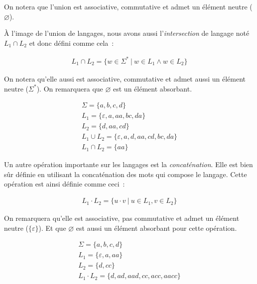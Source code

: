 \noindent On notera que l'union est associative, commutative et admet un
élément neutre (\(\varnothing\)).

\vphantom{}

À l'image de l'union de langages, nous avons aussi l'\textit{intersection} de
langage noté \(L_1 \cap L_2\) et donc défini comme cela~:

\begin{gather}
    L_1 \cap L_2 = \{w \in \Sigma ^ * ~|~ w \in L_1 \land w \in L_2\}
\end{gather}

\noindent On notera qu'elle aussi est associative, commutative et admet
aussi un élément neutre (\(\Sigma ^ *\)). On remarquera que \(\varnothing\) est
un élément absorbant.

\begin{example}
    \begin{gather}
        \Sigma = \{a, b, c, d\} \\
        L_1 = \{\varepsilon, a, aa, bc, da\} \\
        L_2 = \{d, aa, cd\} \\
        L_1 \cup L_2 = \{\varepsilon, a, d, aa, cd, bc, da\} \\
        L_1 \cap L_2 = \{aa\}
    \end{gather}
\end{example}

Un autre opération importante sur les langages est la \textit{concaténation}.
Elle est bien sûr définie en utilisant la concaténation des mots qui compose le
langage. Cette opération est ainsi définie comme ceci~:

\begin{gather}
    L_1 \cdot L_2 = \{u \cdot v ~|~ u \in L_1, v \in L_2\}
\end{gather}

\noindent On remarquera qu'elle est associative, pas commutative et admet un
élément neutre (\(\{\varepsilon\}\)). Et que \(\varnothing\) est aussi un
élément absorbant pour cette opération.

\begin{example}
    \begin{gather}
        \Sigma = \{a, b, c, d\} \\
        L_1 = \{\varepsilon, a, aa\} \\
        L_2 = \{d, cc\} \\
        L_1 \cdot L_2 = \{d, ad, aad, cc, acc, aacc\}
    \end{gather}
\end{example}

